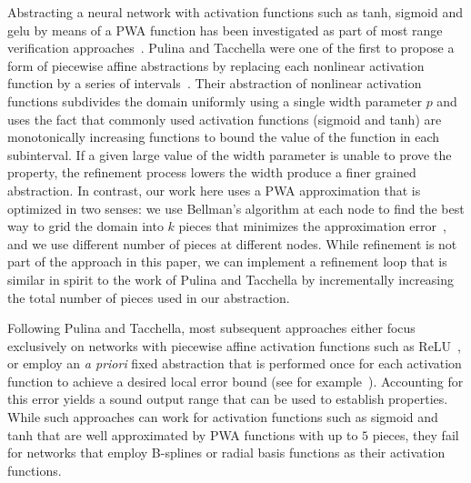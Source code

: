  Abstracting a neural network with activation functions such as tanh, sigmoid and gelu by means of a PWA function has been investigated as part of most range verification approaches~\cite{albarghouthi-book}. 
 Pulina and Tacchella  were one of the first to propose a form of piecewise affine abstractions by replacing each nonlinear activation function by a series of intervals~\cite{Pulina+Tacchella/2012/Challenging}. Their abstraction of nonlinear activation functions subdivides the domain uniformly using a single width parameter $p$ and uses the fact that commonly used activation functions (sigmoid and tanh) are monotonically increasing functions to bound the value of the function in each subinterval. If a given large value of the width parameter is unable to prove the property, the refinement process lowers the width produce a finer grained abstraction.  In contrast, our work here uses a PWA approximation that is optimized in two senses: we use Bellman's algorithm at each node to find the best way to grid the domain into $k$ pieces that minimizes the approximation error~\cite{Bellman/1961/Approximation,Bellman+Roth/1969/Curve}, and we use different number of pieces at different nodes. While refinement is not part of the approach in this paper, we can implement a refinement loop that is similar in spirit to the work of Pulina and Tacchella by incrementally increasing the total number of pieces used in our abstraction. 
 
 Following Pulina and Tacchella, most subsequent approaches either focus exclusively on networks with piecewise affine activation functions such as ReLU~\cite{lomuscio_maganti_2017,katz_barrett_dill_julian_kochenderfer_2017,Ehlers/2017/Formal,Tran+Othrs/2019/Star}, or employ an \emph{a priori} fixed abstraction that is performed once for each activation function to achieve a desired local error bound (see for example~\cite{dutta_chen_jha_sriram_sankaranarayanan_tiwari_2019}). Accounting for this error yields a sound output range that can be used to establish properties. While such approaches can work for activation functions such as sigmoid and tanh that are well approximated by PWA functions with up to $5$ pieces, they fail for networks that employ B-splines or radial basis functions as their activation functions. 

